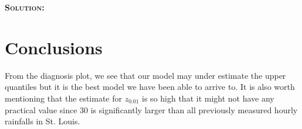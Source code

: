 \documentclass[12pt,oneside]{article}
\newenvironment{solution}
    {\textbf{\textsc{Solution:}}\\}
    {\newpage}
\begin{document}
\begin{solution}
\section*{Conclusions}
From the diagnosis plot, we see that our model may under estimate the upper quantiles but it is the best model we have been able to arrive to. It is also worth mentioning that the estimate for $z_{0.01}$ is so high that it might not have any practical value since 30 is significantly larger than all previously measured hourly rainfalls in St. Louis.
\end{solution}
\end{document}
